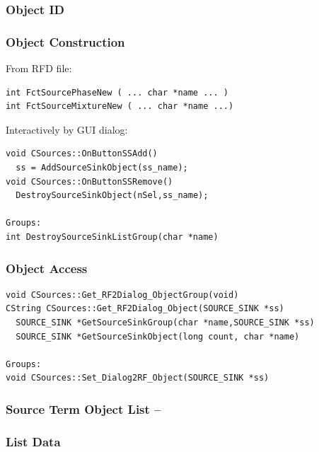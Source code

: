 \subsubsection*{Object ID}

\subsubsection*{Object Construction}

From RFD file:
\small
\begin{verbatim}
int FctSourcePhaseNew ( ... char *name ... )
int FctSourceMixtureNew ( ... char *name ...)
\end{verbatim}
\normalsize

Interactively by GUI dialog:
\small
\begin{verbatim}
void CSources::OnButtonSSAdd()
  ss = AddSourceSinkObject(ss_name);
void CSources::OnButtonSSRemove()
  DestroySourceSinkObject(nSel,ss_name);

Groups:
int DestroySourceSinkListGroup(char *name)
\end{verbatim}
\normalsize

\subsubsection*{Object Access}

\small
\begin{verbatim}
void CSources::Get_RF2Dialog_ObjectGroup(void)
CString CSources::Get_RF2Dialog_Object(SOURCE_SINK *ss)
  SOURCE_SINK *GetSourceSinkGroup(char *name,SOURCE_SINK *ss)
  SOURCE_SINK *GetSourceSinkObject(long count, char *name)

Groups:
void CSources::Set_Dialog2RF_Object(SOURCE_SINK *ss)
\end{verbatim}
\normalsize



\subsubsection{Source Term Object List -- }

\subsubsection*{List Data}

